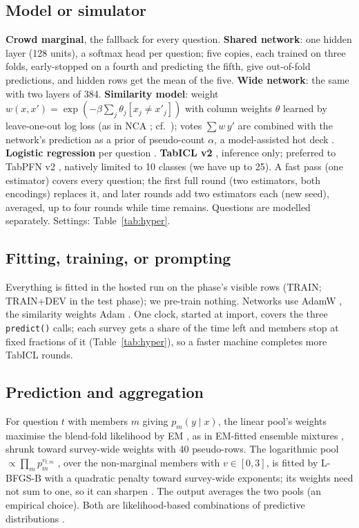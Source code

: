 \documentclass{article}
\begin{document}
\subsection{Model or simulator}
\label{sec:model}
\textbf{Crowd marginal}, the fallback for every question. \textbf{Shared network}: one hidden layer (128 units), a softmax head per question; five copies, each trained on three folds, early-stopped on a fourth and predicting the fifth, give out-of-fold predictions, and hidden rows get the mean of the five. \textbf{Wide network}: the same with two layers of 384. \textbf{Similarity model}: weight $w(x,x')=\exp(-\beta\sum_j\theta_j[x_j\neq x'_j])$ with column weights $\theta$ learned by leave-one-out log loss (as in NCA \citep{goldberger2004nca}; cf.\ \citep{gorishniy2024tabr,ye2025modernnca}); votes $\sum w\,y'$ are combined with the network's prediction as a prior of pseudo-count $\alpha$, a model-assisted hot deck \citep{andridge2010hotdeck}. \textbf{Logistic regression} per question \citep{pedregosa2011sklearn}. \textbf{TabICL v2} \citep{qu2025tabicl,qu2026tabiclv2,tabiclv2ckpt}, inference only; preferred to TabPFN v2 \citep{hollmann2025tabpfn}, natively limited to 10 classes (we have up to 25). A fast pass (one estimator) covers every question; the first full round (two estimators, both encodings) replaces it, and later rounds add two estimators each (new seed), averaged, up to four rounds while time remains. Questions are modelled separately. Settings: Table~\ref{tab:hyper}.

\subsection{Fitting, training, or prompting}
Everything is fitted in the hosted run on the phase's visible rows (TRAIN; TRAIN+DEV in the test phase); we pre-train nothing. Networks use AdamW \citep{loshchilov2019adamw}, the similarity weights Adam \citep{kingma2015adam}. One clock, started at import, covers the three \texttt{predict()} calls; each survey gets a share of the time left and members stop at fixed fractions of it (Table~\ref{tab:hyper}), so a faster machine completes more TabICL rounds.

\subsection{Prediction and aggregation}
\label{sec:agg}
For question $t$ with members $m$ giving $p_m(y\mid x)$, the linear pool's weights maximise the blend-fold likelihood by EM \citep{dempster1977em}, as in EM-fitted ensemble mixtures \citep{raftery2005bma}, shrunk toward survey-wide weights with 40 pseudo-rows. The logarithmic pool $\propto\prod_m p_m^{v_{t,m}}$ \citep{genest1986combining,heskes1998logpool}, over the non-marginal members with $v\in[0,3]$, is fitted by L-BFGS-B \citep{byrd1995lbfgsb} with a quadratic penalty toward survey-wide exponents; its weights need not sum to one, so it can sharpen \citep{ranjan2010combining}. The output averages the two pools (an empirical choice). Both are likelihood-based combinations of predictive distributions \citep{wolpert1992stacked,hall2007combining,geweke2011optimal,yao2018stacking}.
\end{document}
